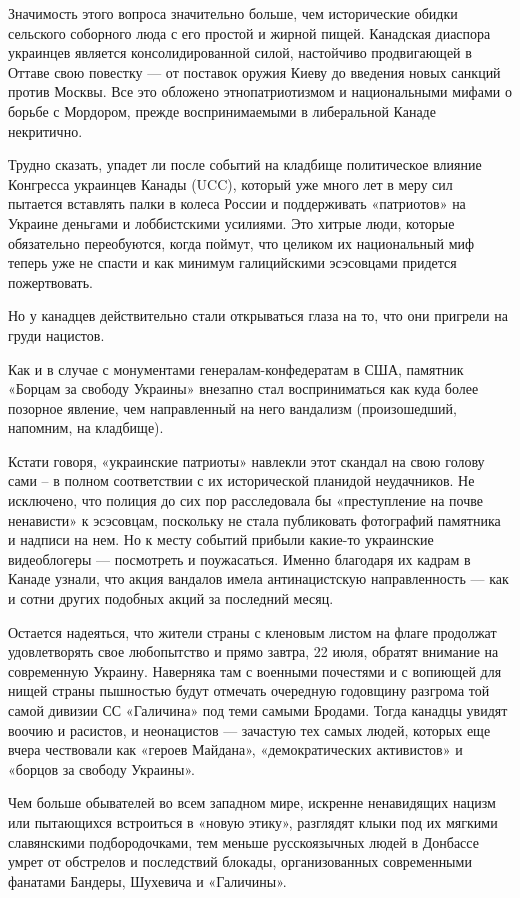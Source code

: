 Значимость этого вопроса значительно больше, чем исторические обидки сельского
соборного люда с его простой и жирной пищей. Канадская диаспора украинцев
является консолидированной силой, настойчиво продвигающей в Оттаве свою
повестку --- от поставок оружия Киеву до введения новых санкций против Москвы.
Все это обложено этнопатриотизмом и национальными мифами о борьбе с Мордором,
прежде воспринимаемыми в либеральной Канаде некритично. 

Трудно сказать, упадет ли после событий на кладбище политическое влияние
Конгресса украинцев Канады (UCC), который уже много лет в меру сил пытается
вставлять палки в колеса России и поддерживать «патриотов» на Украине деньгами
и лоббистскими усилиями. Это хитрые люди, которые обязательно переобуются,
когда поймут, что целиком их национальный миф теперь уже не спасти и как
минимум галицийскими эсэсовцами придется пожертвовать.

Но у канадцев действительно стали открываться глаза на то, что они пригрели на
груди нацистов.

Как и в случае с монументами генералам-конфедератам в США, памятник «Борцам за
свободу Украины» внезапно стал восприниматься как куда более позорное явление,
чем направленный на него вандализм (произошедший, напомним, на кладбище).

Кстати говоря, «украинские патриоты» навлекли этот скандал на свою голову сами
– в полном соответствии с их исторической планидой неудачников. Не исключено,
что полиция до сих пор расследовала бы «преступление на почве ненависти» к
эсэсовцам, поскольку не стала публиковать фотографий памятника и надписи на
нем. Но к месту событий прибыли какие-то украинские видеоблогеры --- посмотреть и
поужасаться. Именно благодаря их кадрам в Канаде узнали, что акция вандалов
имела антинацистскую направленность --- как и сотни других подобных акций за
последний месяц.

Остается надеяться, что жители страны с кленовым листом на флаге продолжат
удовлетворять свое любопытство и прямо завтра, 22 июля, обратят внимание на
современную Украину. Наверняка там с военными почестями и с вопиющей для нищей
страны пышностью будут отмечать очередную годовщину разгрома той самой дивизии
СС «Галичина» под теми самыми Бродами. Тогда канадцы увидят воочию и расистов,
и неонацистов --- зачастую тех самых людей, которых еще вчера чествовали как
«героев Майдана», «демократических активистов» и «борцов за свободу Украины».

Чем больше обывателей во всем западном мире, искренне ненавидящих нацизм или
пытающихся встроиться в «новую этику», разглядят клыки под их мягкими
славянскими подбородочками, тем меньше русскоязычных людей в Донбассе умрет от
обстрелов и последствий блокады, организованных современными фанатами Бандеры,
Шухевича и «Галичины».
  
